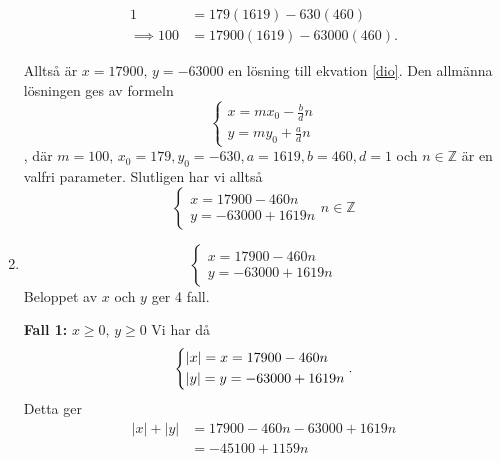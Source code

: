 \documentclass{article}
\begin{document}
\begin{enumerate}[label=(\alph*)]
		\begin{equation*}
			\begin{aligned}
				1 &= 179(1619) - 630(460)\\
				\implies 100 &= 17900(1619) - 63000(460).
			\end{aligned}
		\end{equation*}

		Alltså är $x = 17900, \, y = -63000$ en lösning till ekvation \ref{dio}. Den allmänna lösningen ges av formeln
		\begin{equation*}
			\begin{cases}
				x = mx_0 - \frac{b}{d}n\\
				y = my_0 + \frac{a}{d}n
			\end{cases}
		\end{equation*}
		, där $m = 100, \, x_0 = 179, y_0 = -630, a = 1619, b = 460, d = 1$ och $n \in \mathbb{Z}$ är en valfri parameter. Slutligen har vi alltså
		\begin{equation*}
			\begin{cases}
				x = 17900 - 460n\\
				y = -63000 + 1619n
			\end{cases}
			n \in \mathbb{Z}
		\end{equation*}

	\item
		\begin{equation*}
			\begin{cases}
				x = 17900 - 460n\\
				y = -63000 + 1619n
			\end{cases}
		\end{equation*}
		Beloppet av $x$ och $y$ ger 4 fall.

		\textbf{Fall 1:} $x \geq 0 , \, y \geq 0$
		Vi har då
		\begin{equation*}
			\begin{cases*}
				\lvert x \rvert = x = 17900 - 460n\\
				\lvert y \rvert = y = -63000 + 1619n\\
			\end{cases*}.\\
		\end{equation*}
		Detta ger
		\begin{align}
			\lvert x \rvert + \lvert y \rvert &= 17900 - 460n -63000 + 1619n \nonumber\\
							  &= -45100 + 1159n \label{fall1}
		\end{align}


\end{enumerate}
\end{document}
